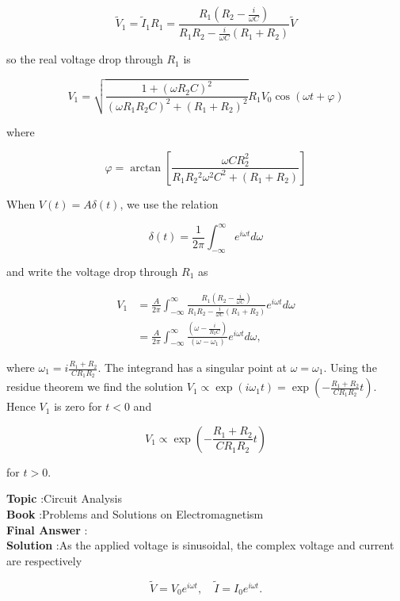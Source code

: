 \documentclass[10pt]{article}
\begin{document}
$$
\tilde{V}_{1}=\tilde{I}_{1} R_{1}=\frac{R_{1}\left(R_{2}-\frac{i}{\omega C}\right)}{R_{1} R_{2}-\frac{i}{\omega C}\left(R_{1}+R_{2}\right)} \tilde{V}
$$

so the real voltage drop through $R_{1}$ is

$$
V_{1}=\sqrt{\frac{1+\left(\omega R_{2} C\right)^{2}}{\left(\omega R_{1} R_{2} C\right)^{2}+\left(R_{1}+R_{2}\right)^{2}}} R_{1} V_{0} \cos (\omega t+\varphi)
$$

where

$$
\varphi=\arctan \left[\frac{\omega C R_{2}^{2}}{R_{1} R_{2}{ }^{2} \omega^{2} C^{2}+\left(R_{1}+R_{2}\right)}\right]
$$

 When $V(t)=A \delta(t)$, we use the relation

$$
\delta(t)=\frac{1}{2 \pi} \int_{-\infty}^{\infty} e^{i \omega t} d \omega
$$

and write the voltage drop through $R_{1}$ as

$$
\begin{aligned}
V_{1} &=\frac{A}{2 \pi} \int_{-\infty}^{\infty} \frac{R_{1}\left(R_{2}-\frac{i}{\omega C}\right)}{R_{1} R_{2}-\frac{i}{\omega C}\left(R_{1}+R_{2}\right)} e^{i \omega t} d \omega \\
&=\frac{A}{2 \pi} \int_{-\infty}^{\infty} \frac{\left(\omega-\frac{i}{R_{2} C}\right)}{\left(\omega-\omega_{1}\right)} e^{i \omega t} d \omega,
\end{aligned}
$$

where $\omega_{1}=i \frac{R_{1}+R_{2}}{C R_{1} R_{2}}$. The integrand has a singular point at $\omega=\omega_{1}$. Using the residue theorem we find the solution $V_{1} \propto \exp \left(i \omega_{1} t\right)=\exp \left(-\frac{R_{1}+R_{2}}{C R_{1} R_{2}} t\right)$. Hence $V_{1}$ is zero for $t<0$ and

$$
V_{1} \propto \exp \left(-\frac{R_{1}+R_{2}}{C R_{1} R_{2}} t\right)
$$

for $t>0$.

\textbf{Topic} :Circuit Analysis\\
\textbf{Book} :Problems and Solutions on Electromagnetism\\
\textbf{Final Answer} :\arctan {}\\


\textbf{Solution} :As the applied voltage is sinusoidal, the complex voltage and current are respectively

$$
\tilde{V}=V_{0} e^{i \omega t}, \quad \tilde{I}=I_{0} e^{i \omega t} .
$$
\end{document}
